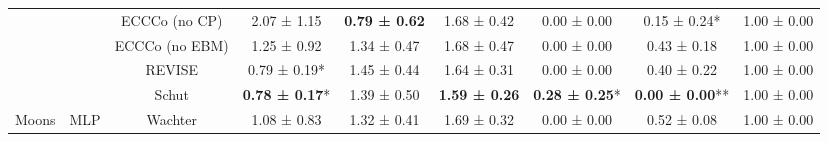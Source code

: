 \begin{table}
{\begin{tabular}[t]{ccccccccc}
 &  & ECCCo (no CP) & 2.07 ± 1.15\hphantom{*}\hphantom{*} & \textbf{0.79 ± 0.62}\hphantom{*}\hphantom{*} & 1.68 ± 0.42\hphantom{*}\hphantom{*} & 0.00 ± 0.00\hphantom{*}\hphantom{*} & 0.15 ± 0.24*\hphantom{*} & 1.00 ± 0.00\hphantom{*}\hphantom{*}\\

 &  & ECCCo (no EBM) & 1.25 ± 0.92\hphantom{*}\hphantom{*} & 1.34 ± 0.47\hphantom{*}\hphantom{*} & 1.68 ± 0.47\hphantom{*}\hphantom{*} & 0.00 ± 0.00\hphantom{*}\hphantom{*} & 0.43 ± 0.18\hphantom{*}\hphantom{*} & 1.00 ± 0.00\hphantom{*}\hphantom{*}\\

 &  & REVISE & 0.79 ± 0.19*\hphantom{*} & 1.45 ± 0.44\hphantom{*}\hphantom{*} & 1.64 ± 0.31\hphantom{*}\hphantom{*} & 0.00 ± 0.00\hphantom{*}\hphantom{*} & 0.40 ± 0.22\hphantom{*}\hphantom{*} & 1.00 ± 0.00\hphantom{*}\hphantom{*}\\

 &  & Schut & \textbf{0.78 ± 0.17}*\hphantom{*} & 1.39 ± 0.50\hphantom{*}\hphantom{*} & \textbf{1.59 ± 0.26}\hphantom{*}\hphantom{*} & \textbf{0.28 ± 0.25}*\hphantom{*} & \textbf{0.00 ± 0.00}** & 1.00 ± 0.00\hphantom{*}\hphantom{*}\\

\multirow[t]{-12}{*}{\centering\arraybackslash Moons} & \multirow[t]{-6}{*}{\centering\arraybackslash MLP} & Wachter & 1.08 ± 0.83\hphantom{*}\hphantom{*} & 1.32 ± 0.41\hphantom{*}\hphantom{*} & 1.69 ± 0.32\hphantom{*}\hphantom{*} & 0.00 ± 0.00\hphantom{*}\hphantom{*} & 0.52 ± 0.08\hphantom{*}\hphantom{*} & 1.00 ± 0.00\hphantom{*}\hphantom{*}\\
\bottomrule
\end{tabular}}
\end{table}
